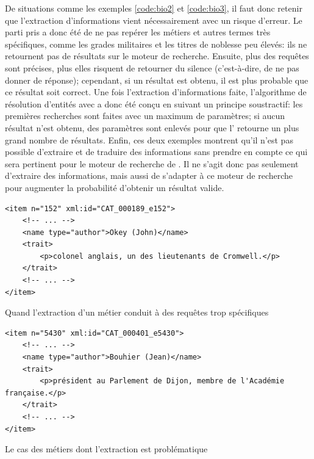 De situations comme les exemples \ref{code:bio2} et \ref{code:bio3}, il faut donc retenir que l'extraction d'informations vient nécessairement avec un risque d'erreur. Le parti pris a donc été de ne pas repérer les métiers et autres termes très spécifiques, comme les grades militaires et les titres de noblesse peu élevés: ils ne retournent pas de résultats sur le moteur de recherche. Ensuite, plus des requêtes sont précises, plus elles risquent de retourner du silence (c'est-à-dire, de ne pas donner de réponse); cependant, si un résultat est obtenu, il est plus probable que ce résultat soit correct. Une fois l'extraction d'informations faite, l'algorithme de résolution d'entités avec \wkd{} a donc été conçu en suivant un principe soustractif: les premières recherches sont faites avec un maximum de paramètres; si aucun résultat n'est obtenu, des paramètres sont enlevés pour que l'\api{} retourne un plus grand nombre de résultats. Enfin, ces deux exemples montrent qu'il n'est pas possible d'extraire et de traduire des informations sans prendre en compte ce qui sera pertinent pour le moteur de recherche de \wkd{}. Il ne s'agit donc pas seulement d'extraire des informations, mais aussi de s'adapter à ce moteur de recherche pour augmenter la probabilité d'obtenir un résultat valide.

\begin{listing}
	\begin{verbatim}
<item n="152" xml:id="CAT_000189_e152">
	<!-- ... -->
	<name type="author">Okey (John)</name>
	<trait>
		<p>colonel anglais, un des lieutenants de Cromwell.</p>
	</trait>
	<!-- ... -->
</item>
	\end{verbatim}
	\caption{Quand l'extraction d'un métier conduit à des requêtes trop spécifiques}
	\label{code:bio2}
\end{listing}

\begin{listing}
	\begin{verbatim}
<item n="5430" xml:id="CAT_000401_e5430">
	<!-- ... -->
	<name type="author">Bouhier (Jean)</name>
	<trait>
		<p>président au Parlement de Dijon, membre de l'Académie française.</p>
	</trait>
	<!-- ... -->
</item>
	\end{verbatim}
	\caption{Le cas des métiers dont l'extraction est problématique}
	\label{code:bio3}
\end{listing}

